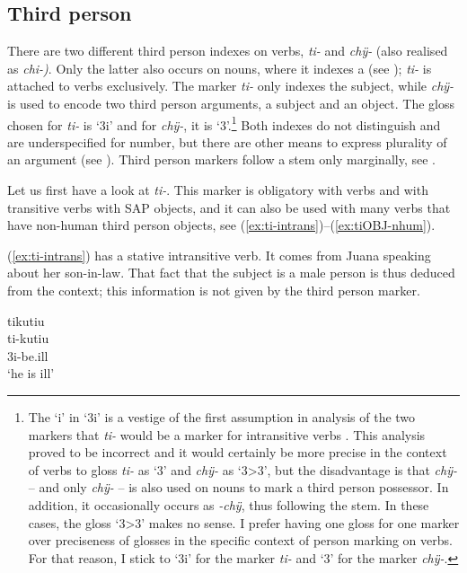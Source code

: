 \subsection{Third person}\label{sec:3Marking}

There are two different third person indexes on verbs, \textit{ti-} and \textit{chÿ-} (also realised as \textit{chi-)}. Only the latter also occurs on nouns, where it indexes a  (see ); \textit{ti-} is attached to verbs exclusively. The marker \textit{ti-} only indexes the subject, while \textit{chÿ-} is used to encode two third person arguments, a subject and an object. The gloss chosen for \textit{ti-} is ‘3i’ and for \textit{chÿ-}, it is ‘3’.\footnote{The ‘i’ in ‘3i’ is a vestige of the first assumption in analysis of the two markers that \textit{ti-} would be a marker for intransitive verbs \citep[cf.][506]{Danielsen2011}. This analysis proved to be incorrect and it would certainly be more precise in the context of verbs to gloss \textit{ti-} as ‘3’ and \textit{chÿ-} as ‘3>3’, but the disadvantage is that \textit{chÿ-} – and only \textit{chÿ-} – is also used on nouns to mark a third person possessor. In addition, it occasionally occurs as \textit{-chÿ}, thus following the stem. In these cases, the gloss ‘3>3’ makes no sense. I prefer having one gloss for one marker over preciseness of glosses in the specific context of person marking on verbs. For that reason, I stick to ‘3i’ for the marker \textit{ti-} and ‘3’ for the marker \textit{chÿ-}.} Both indexes do not distinguish  and are underspecified for number, but there are other means to express plurality of an argument (see ). Third person markers follow a stem only marginally, see .

Let us first have a look at \textit{ti-}. This marker is obligatory with  verbs and with transitive verbs with SAP objects, and it can also be used with many  verbs that have non-human third person objects, see (\ref{ex:ti-intrans})--(\ref{ex:tiOBJ-nhum}).

(\ref{ex:ti-intrans}) has a stative intransitive verb. It comes from Juana speaking about her son-in-law. That fact that the subject is a male person is thus deduced from the context; this information is not given by the third person marker.

\ea\label{ex:ti-intrans}
\begingl 
\glpreamble tikutiu\\
\gla ti-kutiu\\ 
\glb 3i-be.ill\\ 
\glft ‘he is ill’\\ 
\endgl
\trailingcitation{[jxx-p110923l-1.043]}
\xe

